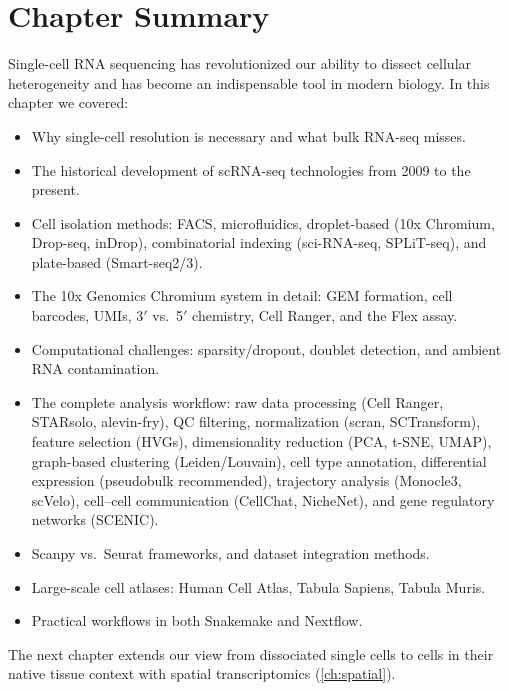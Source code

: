 \section{Chapter Summary}
\label{sec:scrnaseq:summary}

Single-cell RNA sequencing has revolutionized our ability to dissect cellular
heterogeneity and has become an indispensable tool in modern biology. In this
chapter we covered:

\begin{itemize}[nosep]
  \item Why single-cell resolution is necessary and what bulk RNA-seq misses.
  \item The historical development of scRNA-seq technologies from 2009 to the
    present.
  \item Cell isolation methods: FACS, microfluidics, droplet-based (10x
    Chromium, Drop-seq, inDrop), combinatorial indexing (sci-RNA-seq, SPLiT-seq),
    and plate-based (Smart-seq2/3).
  \item The 10x Genomics Chromium system in detail: GEM formation, cell barcodes,
    UMIs, 3$'$ vs.\ 5$'$ chemistry, Cell Ranger, and the Flex assay.
  \item Computational challenges: sparsity/dropout, doublet detection, and
    ambient RNA contamination.
  \item The complete analysis workflow: raw data processing (Cell Ranger, STARsolo,
    alevin-fry), QC filtering, normalization (scran, SCTransform), feature
    selection (HVGs), dimensionality reduction (PCA, t-SNE, UMAP), graph-based
    clustering (Leiden/Louvain), cell type annotation, differential expression
    (pseudobulk recommended), trajectory analysis (Monocle3, scVelo),
    cell--cell communication (CellChat, NicheNet), and gene regulatory networks
    (SCENIC).
  \item Scanpy vs.\ Seurat frameworks, and dataset integration methods.
  \item Large-scale cell atlases: Human Cell Atlas, Tabula Sapiens, Tabula Muris.
  \item Practical workflows in both Snakemake and Nextflow.
\end{itemize}

The next chapter extends our view from dissociated single cells to cells in
their native tissue context with spatial transcriptomics (\cref{ch:spatial}).
